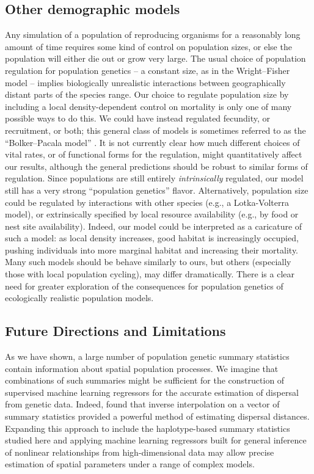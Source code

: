 \documentclass[10pt,twoside,lineno,hidelinks]{preprint}
\begin{document}
\subsection{Other demographic models}

Any simulation of a population of reproducing organisms for a reasonably long amount of time
requires some kind of control on population sizes,
or else the population will either die out or grow very large. 
The usual choice of population regulation for population genetics --
a constant size, as in the Wright--Fisher model --
implies biologically unrealistic interactions between geographically distant parts of the species range.
Our choice to regulate population size by including a local density-dependent control on mortality
is only one of many possible ways to do this.
We could have instead regulated fecundity, or recruitment, or both;
this general class of models
is sometimes referred to as the ``Bolker--Pacala model'' \citep{bolker1997using}.
It is not currently clear how much different choices of vital rates,
or of functional forms for the regulation,
might quantitatively affect our results,
although the general predictions should be robust to similar forms of regulation.
Since populations are still entirely \emph{intrinsically} regulated,
our model still has a very strong ``population genetics'' flavor.
Alternatively, population size could be regulated by interactions with other species
(e.g., a Lotka-Volterra model),
or extrinsically specified by local resource availability
(e.g., by food or nest site availability).
Indeed, our model could be interpreted as a caricature of such a model:
as local density increases, good habitat is increasingly occupied,
pushing individuals into more marginal habitat and increasing their mortality.
Many such models should be behave similarly to ours,
but others (especially those with local population cycling), may differ dramatically.
There is a clear need for greater exploration of 
the consequences for population genetics of ecologically realistic population models.


\subsection{Future Directions and Limitations}

As we have shown, a large number of population genetic summary statistics contain information about spatial population processes. We imagine that combinations of such summaries might be sufficient for the construction of supervised machine learning regressors \citep[e.g.,][]{Schrider2018} for the accurate estimation of dispersal from genetic data. Indeed, \citet{Ashander2018} found that inverse interpolation on a vector of summary statistics provided a powerful method of estimating dispersal distances. Expanding this approach to include the haplotype-based summary statistics studied here and applying machine learning regressors built for general inference of nonlinear relationships from high-dimensional data may allow precise estimation of spatial parameters under a range of complex models. 
\end{document}
